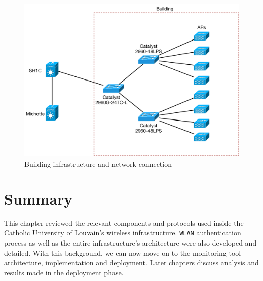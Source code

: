 \begin{figure}[H]
	\center
	\includegraphics[width=.8\linewidth]{Pictures/chapter2/building.png}
	\caption{Building infrastructure and network connection}
\end{figure}


\section{Summary}
This chapter reviewed the relevant components and protocols used inside the Catholic University of Louvain's wireless infrastructure. \texttt{WLAN} authentication process as well as the entire infrastructure's architecture were also developed and detailed. With this background, we can now move on to the monitoring tool architecture, implementation and deployment. Later chapters discuss analysis and results made in the deployment phase.





